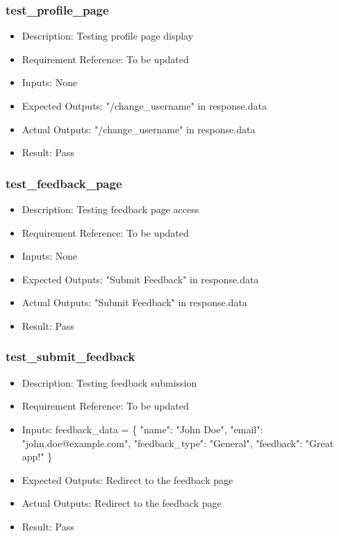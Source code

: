 \documentclass[12pt, titlepage]{article}
\begin{document}
\subsubsection{test\_profile\_page}\label{3.1.8}
\begin{itemize}
    \item Description: Testing profile page display
    \item Requirement Reference: To be updated
    \item Inputs: None
    \item Expected Outputs: "/change\_username" in response.data
    \item Actual Outputs: "/change\_username" in response.data
    \item Result: Pass
\end{itemize}
\subsubsection{test\_feedback\_page}\label{3.1.9}
\begin{itemize}
    \item Description: Testing feedback page access
    \item Requirement Reference: To be updated
    \item Inputs: None
    \item Expected Outputs: "Submit Feedback" in response.data
    \item Actual Outputs: "Submit Feedback" in response.data
    \item Result: Pass
\end{itemize}
\subsubsection{test\_submit\_feedback}\label{3.1.10}
\begin{itemize}
    \item Description: Testing feedback submission
    \item Requirement Reference: To be updated
    \item Inputs: feedback\_data = \{
        "name": "John Doe",
        "email": "john.doe@example.com",
        "feedback\_type": "General",
        "feedback": "Great app!"
    \}
    \item Expected Outputs: Redirect to the feedback page
    \item Actual Outputs: Redirect to the feedback page
    \item Result: Pass
\end{itemize}
\end{document}

